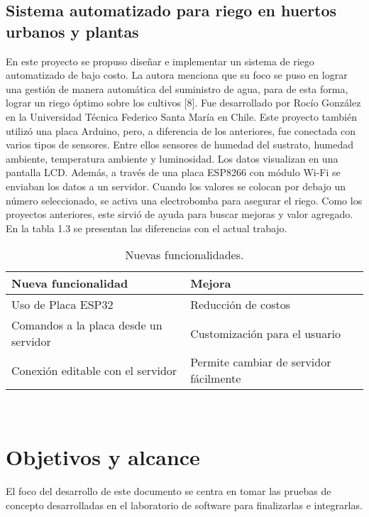 \subsection{Sistema automatizado para riego en huertos urbanos y plantas}
En este proyecto se propuso diseñar e implementar un sistema de riego automatizado de bajo costo. La autora menciona que su foco se puso en lograr una gestión de manera automática del suministro de agua, para de esta forma, lograr un riego óptimo sobre los cultivos [8]. Fue desarrollado por Rocío González en la Universidad Técnica Federico Santa María en Chile.
Este proyecto también utilizó una placa Arduino, pero, a diferencia de los anteriores, fue conectada con varios tipos de sensores. Entre ellos sensores de humedad del sustrato, humedad ambiente, temperatura ambiente y luminosidad. Los datos visualizan en una pantalla LCD. Además, a través de una placa ESP8266 con módulo Wi-Fi se enviaban los datos a un servidor. Cuando los valores se colocan por debajo un número seleccionado, se activa una electrobomba para asegurar el riego. Como los proyectos anteriores, este sirvió de ayuda para buscar mejoras y valor agregado. En la tabla 1.3 se presentan las diferencias con el actual trabajo.\\

\begin{table}[h]
	\centering
	\caption[Nuevas funcionalidades sobre el proyecto de Rocío González]{Nuevas funcionalidades.}
	\begin{tabular}{l l}    
		\toprule
		\textbf{Nueva funcionalidad} & \textbf{Mejora}\\	
		\midrule
		Uso de Placa ESP32           & Reducción de costos	\\		
		Comandos a la placa desde un servidor          & Customización para el usuario\\	
		Conexión editable con el servidor & Permite cambiar de servidor fácilmente\\	
		\bottomrule
		\hline
	\end{tabular}
	\label{tab:peces}\\
\end{table}


\section{Objetivos y alcance}
El foco del desarrollo de este documento  se centra en tomar las pruebas de concepto desarrolladas en el laboratorio de software para finalizarlas e integrarlas.

